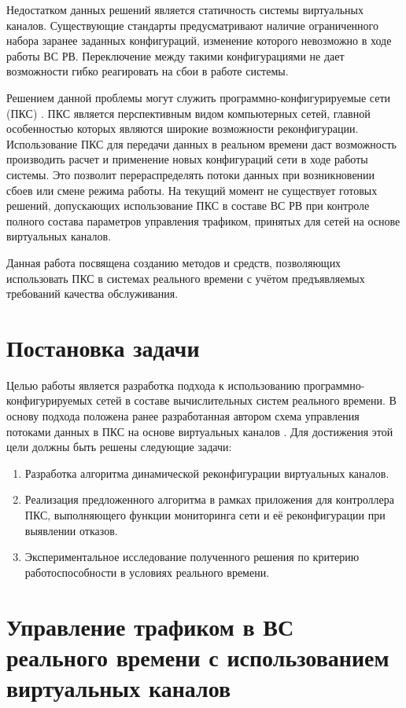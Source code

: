 \documentclass[12pt, a4paper]{article}
\begin{document}
Недостатком данных решений является статичность системы виртуальных каналов. Существующие стандарты предусматривают наличие ограниченного набора заранее заданных конфигураций, изменение которого невозможно в ходе работы ВС РВ. Переключение между такими конфигурациями не дает возможности гибко реагировать на сбои в работе системы.

Решением данной проблемы могут служить программно-конфигурируемые сети (ПКС) \cite{sdn}. ПКС является перспективным видом компьютерных сетей, главной особенностью которых являются широкие возможности реконфигурации. Использование ПКС для передачи данных в реальном времени даст возможность производить расчет и применение новых конфигураций сети в ходе работы системы. Это позволит перераспределять потоки данных при возникновении сбоев или смене режима работы. На текущий момент не существует готовых решений, допускающих использование ПКС в составе ВС РВ при контроле полного состава параметров управления трафиком, принятых для сетей на основе виртуальных каналов.

Данная работа посвящена созданию методов и средств, позволяющих использовать ПКС в системах реального времени с учётом предъявляемых требований качества обслуживания.

\section{Постановка задачи}
Целью работы является разработка подхода к использованию программно-конфигурируемых сетей в составе вычислительных систем реального времени. В основу подхода положена ранее разработанная автором схема управления потоками данных в ПКС на основе виртуальных каналов \cite{vlsdn}. Для достижения этой цели должны быть решены следующие задачи:
\begin{enumerate}
	\item Разработка алгоритма динамической реконфигурации виртуальных каналов.
	\item Реализация предложенного алгоритма в рамках приложения для контроллера ПКС, выполняющего функции мониторинга сети и её реконфигурации при выявлении отказов.
	\item Экспериментальное исследование полученного решения по критерию работоспособности в условиях реального времени.
\end{enumerate}

\section{Управление трафиком в ВС реального времени с использованием виртуальных каналов} \label{sec:scheme}
\end{document}
